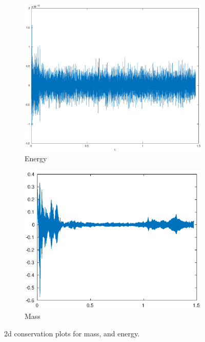 \begin{figure}[htp]
    \centering
    \begin{subfigure}[b]{0.46\textwidth}
        \centering
        \includegraphics[width=\textwidth]{images/cons_mass.eps}\hfill
        \caption{Energy}
        \label{fig:Energy}
    \end{subfigure}
    \hfill
    \begin{subfigure}[b]{0.45\textwidth}
        \centering
        \includegraphics[width=\textwidth]{images/cons_energy.eps}\hfill
        \caption{Mass}
        \label{fig:Mass}
    \end{subfigure}
    \caption{2d conservation plots for mass, and energy.}
    \label{fig:three graphs}
\end{figure}

